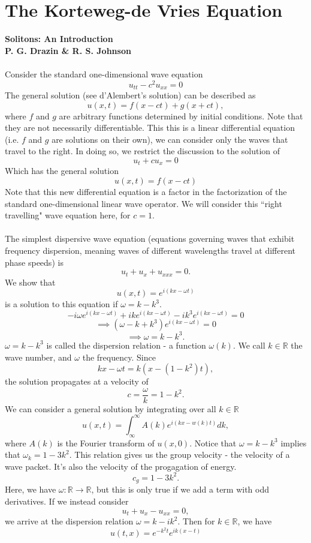 \documentclass[fleqn, 12pt]{article}
\newcommand{\R}{\mathbb{R}}
\begin{document}
\section*{The Korteweg-de Vries Equation}
\textbf{Solitons: An Introduction}
\\
\textbf{P. G. Drazin \& R. S. Johnson}
\\\\
Consider the standard one-dimensional wave equation
\[
    u_{tt}-c^2u_{xx}=0
\]
The general solution (see d'Alembert's solution) can be described as 
\[
u(x,t)=f(x-ct)+g(x+ct),
\]
where $f$ and $g$ are arbitrary functions determined by initial conditions. Note that they are not necessarily differentiable. This this is a linear differential equation (i.e. $f$ and $g$ are solutions on their own), we can consider only the waves that travel to the right. In doing so, we restrict the discussion to the solution of
\[
u_t+cu_x=0
\]
Which has the general solution
\[
u(x,t)=f(x-ct)
\]
Note that this new differential equation is a factor in the factorization of the standard one-dimensional linear wave operator. We will consider this ``right travelling" wave equation here, for $c=1$.
\\\\
The simplest dispersive wave equation (equations governing waves that exhibit frequency dispersion, meaning waves of different wavelengths travel at different phase speeds) is
\[
u_t+u_x+u_{xxx}=0.
\]
We show that
\[
u(x,t)=e^{i(kx-\omega t)}
\]
is a solution to this equation if $\omega=k-k^3$.
\[
-i\omega e^{i(kx-\omega t)}+ike^{i(kx-\omega t)}-ik^3e^{i(kx-\omega t)}=0
\]
\[
\implies (\omega-k+k^3)e^{i(kx-\omega t)}=0
\]
\[
\implies\omega=k-k^3.
\]
$\omega=k-k^3$ is called the dispersion relation - a function $\omega(k)$. We call $k\in\R$ the wave number, and $\omega$ the frequency. Since
\[
kx-\omega t=k(x-(1-k^2)t),
\]
the solution propagates at a velocity of
\[
c=\frac{\omega}{k}=1-k^2.
\]
We can consider a general solution by integrating over all $k\in\R$
\[
u(x,t)=\int_\infty^\infty A(k)e^{i(kx-w(k)t)}dk,
\]
where $A(k)$ is the Fourier transform of $u(x,0)$. Notice that $\omega=k-k^3$ implies that $\omega_k=1-3k^2$. This relation gives us the group velocity - the velocity of a wave packet. It's also the velocity of the progagation of energy.
\[
c_g=1-3k^2.
\]
Here, we have $\omega:\R\to\R$, but this is only true if we add a term with odd derivatives. If we instead consider
\[
u_t+u_x-u_{xx}=0,
\]
we arrive at the dispersion relation $\omega=k-ik^2$. Then for $k\in\R$, we have
\[
u(t,x)=e^{-k^2t}e^{ik(x-t)}
\]
\end{document}
